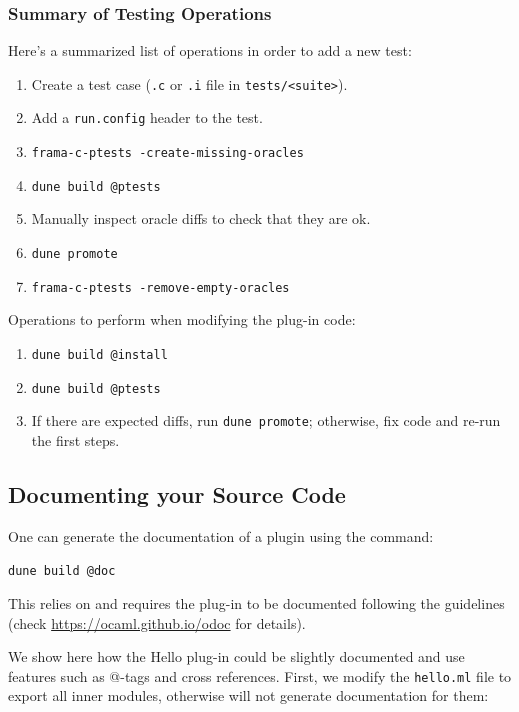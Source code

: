 \subsubsection{Summary of Testing Operations}

Here's a summarized list of operations in order to add a new test:

\begin{enumerate}
\item Create a test case (\texttt{.c} or \texttt{.i} file in
  \texttt{tests/<suite>}).
\item Add a \texttt{run.config} header to the test.
\item \verb|frama-c-ptests -create-missing-oracles|
\item \verb|dune build @ptests|
\item Manually inspect oracle diffs to check that they are ok.
\item \verb|dune promote|
\item \verb|frama-c-ptests -remove-empty-oracles|
\end{enumerate}

Operations to perform when modifying the plug-in code:

\begin{enumerate}
\item \verb|dune build @install|
\item \verb|dune build @ptests|
\item If there are expected diffs, run \verb|dune promote|;
  otherwise, fix code and re-run the first steps.
\end{enumerate}

\subsection{Documenting your Source Code}
\label{tut2:doc}

One can generate the documentation of a plugin using the command:

\lstinline{dune build @doc}

This relies on \odoc and requires the plug-in to be documented following the
\odoc guidelines (check \url{https://ocaml.github.io/odoc} for details).

We show here how the Hello plug-in could be slightly documented and use
\odoc features such as @-tags and cross references. First, we modify the
\texttt{hello.ml} file to export all inner modules, otherwise \odoc will not
generate documentation for them:

